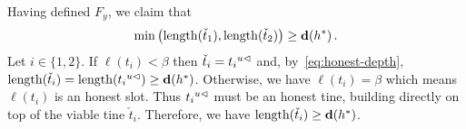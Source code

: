     Having defined $F_y$, we claim that 
    \begin{equation}\label{eq:two-long-tines}
        \min\left(\length(\check{t}_1), \length(\check{t}_2) \right) \geq \hdepth(h^*)
        \,.
    \end{equation}
    Let $i \in \{1,2\}$.
    If $\ell(t_i) < \beta$ then $\check{t}_i = \cut{u}{t_i}$ and,
    by~\eqref{eq:honest-depth}, $\length(\check{t}_i) = \length(\cut{u}{t_i}) \geq \hdepth(h^*)$. 
    Otherwise, we have $\ell(t_i) = \beta$ which means 
    $\ell(t_i)$ is an honest slot. 
    Thus $\cut{u}{t_i}$ must be an honest tine, 
    building directly on top of the viable tine $\check{t}_i$. 
    Therefore, we have $\length(\check{t}_i) \geq \hdepth(h^*)$.


